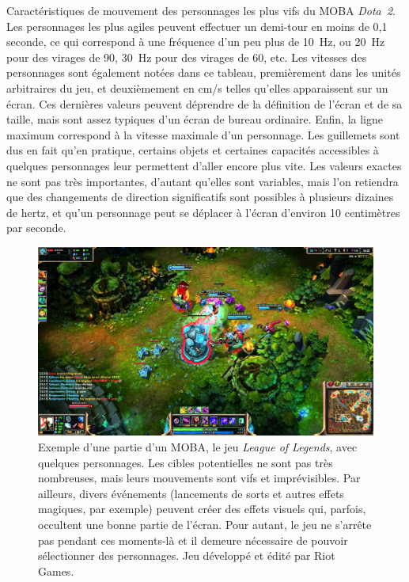 \begin{table}[H]
		\caption[Caractéristiques de mouvement des personnages les plus vifs du MOBA \emph{Dota~2}.]{Caractéristiques de mouvement des personnages les plus vifs du MOBA \emph{Dota~2}. Les personnages les plus \og agiles \fg{} peuvent effectuer un demi-tour en moins de 0,1 seconde, ce qui correspond à une fréquence d'un peu plus de 10~Hz, ou 20~Hz pour des virages de 90\textdegree, 30~Hz pour des virages de 60\textdegree, etc. Les vitesses des personnages sont également notées dans ce tableau, premièrement dans les unités arbitraires du jeu, et deuxièmement en cm/s telles qu'elles apparaissent sur un écran. Ces dernières valeurs peuvent déprendre de la définition de l'écran et de sa taille, mais sont assez typiques d'un écran de bureau ordinaire. Enfin, la ligne \og maximum \fg{} correspond à la vitesse \og maximale \fg{} d'un personnage. Les guillemets sont dus en fait qu'en pratique, certains objets et certaines capacités accessibles à quelques personnages leur permettent d'aller encore plus vite. Les valeurs exactes ne sont pas très importantes, d'autant qu'elles sont variables, mais l'on retiendra que des changements de direction significatifs sont possibles à plusieurs dizaines de hertz, et qu'un personnage peut se déplacer à l'écran d'environ 10 centimètres par seconde.}
		\label{tab:dotamoves}
	\end{table}
	

	
	\begin{figure}[H]
		\centering
		\includegraphics[width=\textwidth]{figures/ch1/lol}
		\caption[Une partie d'un MOBA, \emph{League of Legends}.]{Exemple d'une partie d'un MOBA, le jeu \emph{League of Legends}, avec quelques personnages. Les cibles potentielles ne sont pas très nombreuses, mais leurs mouvements sont vifs et imprévisibles. Par ailleurs, divers événements (lancements de sorts et autres effets magiques, par exemple) peuvent créer des effets visuels qui, parfois, occultent une bonne partie de l'écran. Pour autant, le jeu ne s'arrête pas pendant ces moments-là et il demeure nécessaire de pouvoir sélectionner des personnages. Jeu développé et édité par Riot Games.}
		\label{fig:lol}
	\end{figure}
	
